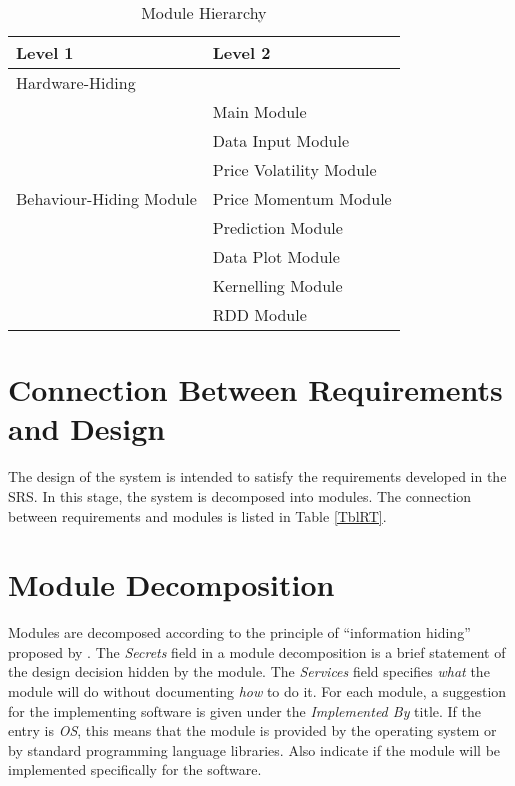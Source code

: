 \documentclass[12pt, titlepage]{article}
\begin{document}
\begin{table}[h!]
\centering
\begin{tabular}{p{} p{}}
\toprule
\textbf{Level 1} & \textbf{Level 2} \\
\midrule

{Hardware-Hiding} & ~ \\
\midrule


\multirow{7}{0.3\textwidth}{Behaviour-Hiding Module}
& Main Module\\
& Data Input Module\\
& Price Volatility Module\\
& Price Momentum Module\\
& Prediction Module\\
\midrule

\multirow{1}{0.3\textwidth}{Software Decision Module} & Data Plot Module\\
&Kernelling Module\\
& RDD Module\\
\bottomrule

\end{tabular}
\caption{Module Hierarchy}
\label{TblMH}
\end{table}

\section{Connection Between Requirements and Design} \label{SecConnection}

The design of the system is intended to satisfy the requirements developed in
the SRS. In this stage, the system is decomposed into modules. The connection
between requirements and modules is listed in Table \ref{TblRT}.

\section{Module Decomposition} \label{SecMD}

Modules are decomposed according to the principle of ``information hiding''
proposed by \citet{ParnasEtAl1984}. The \emph{Secrets} field in a module
decomposition is a brief statement of the design decision hidden by the
module. The \emph{Services} field specifies \emph{what} the module will do
without documenting \emph{how} to do it. For each module, a suggestion for the
implementing software is given under the \emph{Implemented By} title. If the
entry is \emph{OS}, this means that the module is provided by the operating
system or by standard programming language libraries. Also indicate if the
module will be implemented specifically for the software.
\end{document}

